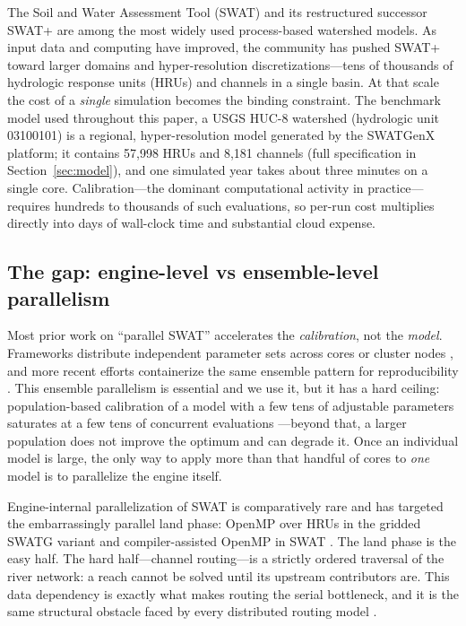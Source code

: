 The Soil and Water Assessment Tool (SWAT) and its restructured successor SWAT+
\citep{Arnold1998SWAT,Bieger2017SWATPlus} are among the most widely used process-based
watershed models. As input data and computing have improved, the community has pushed SWAT+
toward larger domains and hyper-resolution discretizations---tens of thousands of
hydrologic response units (HRUs) and channels in a single basin. At that scale the cost of a
\emph{single} simulation becomes the binding constraint. The benchmark model used throughout
this paper, a USGS HUC-8 watershed (hydrologic unit 03100101) is a regional, hyper-resolution model
generated by the SWATGenX platform; it contains 57{,}998 HRUs and 8{,}181 channels (full
specification in Section~\ref{sec:model}), and one simulated year takes about three minutes on
a single core. Calibration---the dominant computational activity in practice---requires
hundreds to thousands of such evaluations, so per-run cost multiplies directly into days of
wall-clock time and substantial cloud expense.

\subsection{The gap: engine-level vs ensemble-level parallelism}
Most prior work on ``parallel SWAT'' accelerates the \emph{calibration}, not the
\emph{model}. Frameworks distribute independent parameter sets across cores or cluster nodes
\citep{Rouholahnejad2012Parallelization,Zhang2013Multiobjective,Yalew2013Grid}, and more
recent efforts containerize the same ensemble pattern for reproducibility
\citep{PASS4SWAT2024}. This ensemble parallelism is essential and we use it, but it has a
hard ceiling: population-based calibration of a model with a few tens of adjustable
parameters saturates at a few tens of concurrent evaluations \citep{Rafiei2022Calibration}---beyond
that, a larger population does not improve the optimum and can degrade it. Once an individual model
is large,
the only way to apply more than that handful of cores to \emph{one} model is to parallelize
the engine itself.

Engine-internal parallelization of SWAT is comparatively rare and has targeted the
embarrassingly parallel land phase: OpenMP over HRUs in the gridded SWATG variant
\citep{Zhang2017SWATG} and compiler-assisted OpenMP in SWAT \citep{Ki2015OpenMPSWAT}. The
land phase is the easy half. The hard half---channel routing---is a strictly ordered
traversal of the river network: a reach cannot be solved until its upstream contributors
are. This data dependency is exactly what makes routing the serial bottleneck, and it is the
same structural obstacle faced by every distributed routing model
\citep{David2011RAPID,Mizukami2021mizuRoute,Yamazaki2011CaMaFlood}.

